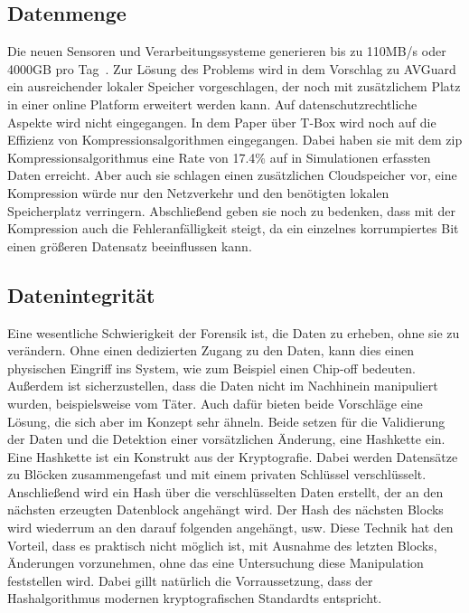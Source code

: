 \documentclass[conference,compsoc,final,a4paper]{IEEEtran}
\begin{document}
\subsection{Datenmenge}
Die neuen Sensoren und Verarbeitungssysteme generieren bis zu 110MB/s oder 4000GB pro Tag~\cite{Hoque_2021a}.
Zur Lösung des Problems wird in dem Vorschlag zu AVGuard ein ausreichender lokaler Speicher vorgeschlagen, der noch mit
zusätzlichem Platz in einer online Platform erweitert werden kann. Auf datenschutzrechtliche Aspekte wird nicht eingegangen.
In dem Paper über T-Box wird noch auf die Effizienz von Kompressionsalgorithmen eingegangen. Dabei haben sie mit dem zip Kompressionsalgorithmus
eine Rate von 17.4\% auf in Simulationen erfassten Daten erreicht. Aber auch sie schlagen einen zusätzlichen Cloudspeicher vor,
eine Kompression würde nur den Netzverkehr und den benötigten lokalen Speicherplatz verringern.
Abschließend geben sie noch zu bedenken, dass mit der Kompression auch die Fehleranfälligkeit steigt, da ein einzelnes korrumpiertes Bit
einen größeren Datensatz beeinflussen kann.

\subsection{Datenintegrität}

Eine wesentliche Schwierigkeit der Forensik ist, die Daten zu erheben, ohne sie zu verändern. Ohne einen dedizierten Zugang
zu den Daten, kann dies einen physischen Eingriff ins System, wie zum Beispiel einen Chip-off bedeuten.
Außerdem ist sicherzustellen, dass die Daten nicht im Nachhinein manipuliert wurden, beispielsweise vom Täter.
Auch dafür bieten beide Vorschläge eine Lösung, die sich aber im Konzept sehr ähneln.
Beide setzen für die Validierung der Daten und die Detektion einer vorsätzlichen Änderung, eine Hashkette ein.\\
Eine Hashkette ist ein Konstrukt aus der Kryptografie.
Dabei werden Datensätze zu Blöcken zusammengefast und mit einem privaten Schlüssel verschlüsselt.
Anschließend wird ein Hash über die verschlüsselten Daten erstellt, der an den nächsten erzeugten Datenblock angehängt wird.
Der Hash des nächsten Blocks wird wiederrum an den darauf folgenden angehängt, usw.
Diese Technik hat den Vorteil, dass es praktisch nicht möglich ist, mit Ausnahme des letzten Blocks, Änderungen vorzunehmen, ohne das eine
Untersuchung diese Manipulation feststellen wird. 
Dabei gillt natürlich die Vorraussetzung, dass der Hashalgorithmus modernen kryptografischen Standardts entspricht.
\end{document}
